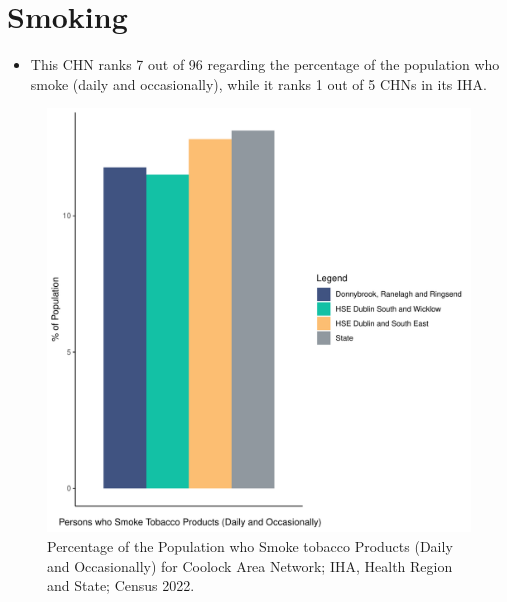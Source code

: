 \documentclass{article}
\begin{document}
\pagebreak

\section{Smoking}\label{sect:Smoking}
\begin{itemize}
\item This CHN ranks  7 out of 96 regarding the percentage of the population who smoke (daily and occasionally), while it ranks   1 out of 5 CHNs in its IHA.
\end{itemize}
\begin{figure}[H]
	\centering
	\includegraphics[width = 120mm]{../figures/SmokingED.pdf}
	\caption{Percentage of the Population who Smoke tobacco Products (Daily and Occasionally) for Coolock Area Network; IHA, Health Region and State; Census 2022.}
	\label{fig:2ae19629-1a6a-13a3-e055-000000000001}
	\end{figure}
	
\end{document}
